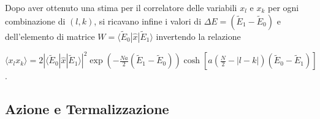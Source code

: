 Dopo aver ottenuto una stima per il correlatore delle variabili $x_l$ e $x_k$ per ogni combinazione di $(l,k)$, si ricavano infine i valori di $\Delta E=(\tilde{E}_1-\tilde{E}_0)$ e dell'elemento di matrice $W=\langle\tilde{E}_0|\hat{x}|\tilde{E}_1\rangle$ invertendo la relazione
\begin{center}
\small
$\langle x_l x_k\rangle = 2|\langle\tilde{E}_0|\hat{x}|\tilde{E}_1\rangle|^2\exp\left(-\frac{Na}{2}(\tilde{E}_1-\tilde{E}_0)\right)\cosh\left[a\left(\frac{N}{2}-|l-k|\right)(\tilde{E}_0-\tilde{E}_1)\right]$.
\end{center}

\subsection{Azione e Termalizzazione}


